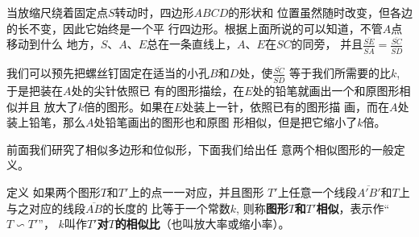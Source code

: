 \begin{solution}
    
\end{solution}

\begin{solution}
    
\end{solution}

\begin{solution}
    
\end{solution}

\begin{solution}
    
\end{solution}

\begin{solution}
    
\end{solution}

\begin{solution}
    
\end{solution}



















当放缩尺绕着固定点$S$转动时，四边形$ABCD$的形状和
位置虽然随时改变，但各边的长不变，因此它始终是一个平
行四边形。根据上面所说的可以知道，不管$A$点移动到什么
地方，$S$、$A$、$E$总在一条直线上，$A$、$E$在$SC$的同旁，
并且$\frac{\overline{SE}}{\overline{SA}}=\frac{\overline{SC}}{\overline{SD}}$

我们可以预先把螺丝钉固定在适当的小孔$B$和$D$处，使$\frac{\overline{SC}}{\overline{SD}}$
等于我们所需要的比$k$, 于是把装在$A$处的尖针依照已
有的图形描绘，在$E$处的铅笔就画出一个和原图形相似并且
放大了$k$倍的图形。如果在$E$处装上一针，依照已有的图形描
画，而在$A$处装上铅笔，那么$A$处铅笔画出的图形也和原图
形相似，但是把它缩小了$k$倍。

前面我们研究了相似多边形和位似形，下面我们给出任
意两个相似图形的一般定义。

\begin{blk}
    {定义}
如果两个图形$T$和$T'$上的点一一对应，并且图形
$T'$上任意一个线段$\overline{A'B'}$和$T$上与之对应的线段$\overline{AB}$的长度的
比等于一个常数$k$, 则称\textbf{图形$T$和$T'$相似}，表示作“$T\backsim T'$”，
$k$叫作\textbf{$T'$对$T$的相似比}（也叫放大率或缩小率）。
\end{blk}

